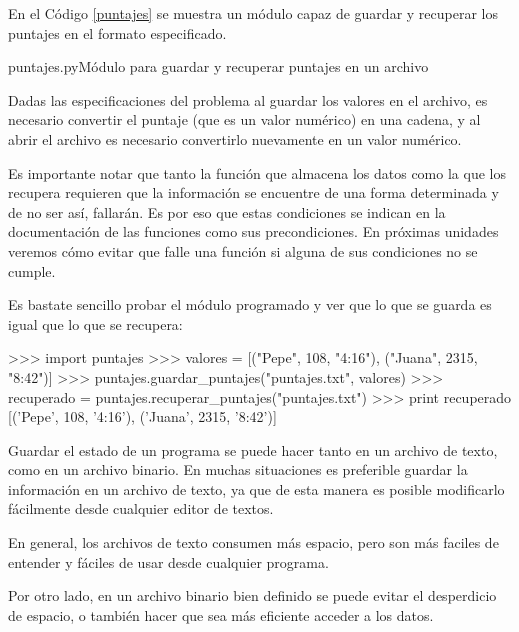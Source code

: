 En el Código \ref{puntajes} se muestra un módulo capaz de guardar y
recuperar los puntajes en el formato especificado.

\begin{codigo}{puntajes.py}{Módulo para guardar y recuperar puntajes en un archivo}
\label{puntajes}

\end{codigo}

Dadas las especificaciones del problema al guardar los valores en el
archivo, es necesario convertir el puntaje (que es un valor numérico) en
una cadena, y al abrir el archivo es necesario convertirlo nuevamente en un
valor numérico.

\begin{observacion}
Es importante notar que tanto la función que almacena los datos como la que
los recupera requieren que la información se encuentre de una forma
determinada y de no ser así, fallarán.  Es por eso que estas condiciones se
indican en la documentación de las funciones como sus precondiciones. En
próximas unidades veremos cómo evitar que falle una función si alguna de
sus condiciones no se cumple.
\end{observacion}

Es bastate sencillo probar el módulo programado y ver que lo que se guarda
es igual que lo que se recupera:

\begin{codigo-python-sn}
>>> import puntajes
>>> valores = [("Pepe", 108, "4:16"), ("Juana", 2315, "8:42")]
>>> puntajes.guardar_puntajes("puntajes.txt", valores)
>>> recuperado = puntajes.recuperar_puntajes("puntajes.txt")
>>> print recuperado
[('Pepe', 108, '4:16'), ('Juana', 2315, '8:42')]
\end{codigo-python-sn}


Guardar el estado de un programa se puede hacer tanto en un
archivo de texto, como en un archivo binario. En muchas
situaciones es preferible guardar la información en un archivo de
texto, ya que de esta manera es posible modificarlo fácilmente
desde cualquier editor de textos.

En general, los archivos de texto consumen más
espacio, pero son más faciles de entender y fáciles de usar desde
cualquier programa.

Por otro lado, en un archivo binario bien definido se puede evitar el
desperdicio de espacio, o también hacer que sea más eficiente acceder a los
datos.

